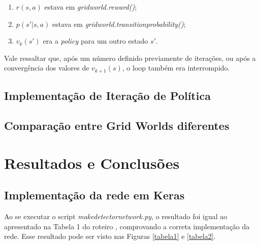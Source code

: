 \documentclass[conference]{IEEEtran}
\begin{document}
\begin{enumerate}
\item $r \left ( s, a \right )$ estava em \textit{grid\underline{\space}world.reward()};

\item $p \left ( s' | s, a \right )$ estava em \textit{grid\underline{\space}world.transition\underline{\space}probability()};

\item $v_k \left ( s' \right )$ era a \textit{policy} para um outro estado $s'$.
\end{enumerate}

Vale ressaltar que, após um número definido previamente de iterações, ou após a convergência dos valores de $v_{k+1}(s)$, o loop também era interrompido.

\subsection{Implementação de Iteração de Política}

\subsection{Comparação entre Grid Worlds diferentes}

\section{Resultados e Conclusões}

\subsection{Implementação da rede em Keras}
Ao se executar o script \textit{make\underline{\space}detector\underline{\space}network.py}, o resultado foi igual ao apresentado na Tabela 1 do roteiro \cite{roteiro}, comprovando a correta implementação da rede. Esse resultado pode ser visto nas Figuras \ref{tabela1} e \ref{tabela2}.
\end{document}
